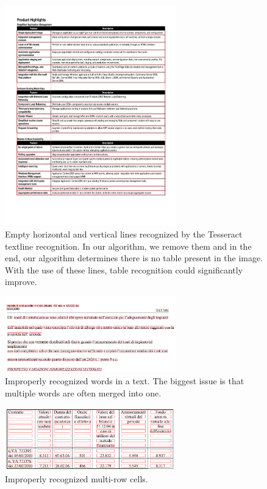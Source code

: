 \begin{figure}[t]
\centering
\includegraphics[width=20em]{img/results/errorTableBordered.png}
\caption{Empty horizontal and vertical lines recognized by the Tesseract textline recognition. In our algorithm, we remove them and in the end, our algorithm determines there is no table present in the image. With the use of these lines, table recognition could significantly improve.}
\label{fig:errorTableBordered}
\end{figure}

\begin{figure}[t]
\centering
\includegraphics[width=20em]{img/results/errorWordWhitespace.png}
\caption{Improperly recognized words in a text. The biggest issue is that multiple words are often merged into one.}
\label{fig:errorWordWs}
\end{figure}

\begin{figure}[t]
\centering
\includegraphics[width=20em]{img/results/errorMultiRow.png}
\caption{Improperly recognized multi-row cells.}
\label{fig:errorMultiRow}
\end{figure}

